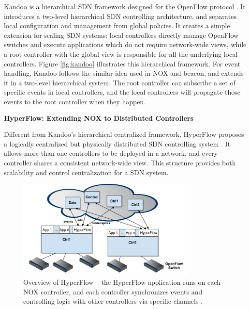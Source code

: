 \documentclass[english]{tktltiki}
\begin{document}
Kandoo is a hierarchical SDN framework designed for the OpenFlow protocol \cite{hyg12}. It introduces a two-level hierarchical SDN controlling architecture, and separates local configuration and management from global policies. It creates a simple extension for scaling SDN systems: local controllers directly manage OpenFlow switches and execute applications which do not require network-wide views, while a root controller with the global view is responsible for all the underlying local controllers. Figure \ref{fig:kandoo} illustrates this hierarchical framework. For event handling, Kandoo follows the similar idea used in NOX and beacon, and extends it in a two-level hierarchical system. The root controller can subscribe a set of specific events in local controllers, and the local controllers will propagate those events to the root controller when they happen.

\vspace{1mm}

\textbf{HyperFlow: Extending NOX to Distributed Controllers}

\vspace{1mm}

Different from Kandoo's hierarchical centralized framework, HyperFlow proposes a logically centralized but physically distributed SDN controlling system \cite{tg10}. It allows more than one controllers to be deployed in a network, and every controller shares a consistent network-wide view. This structure provides both scalability and control centralization for a SDN system.

\begin{figure}[htbp]
  \centering
  \includegraphics[width=0.8\textwidth]{images/hyperflow.png}
  \caption{Overview of HyperFlow -- the HyperFlow application runs on each NOX controller, and each controller synchronizes events and controlling logic with other controllers via specific channels \cite{tg10}.}
  \label{fig:hyperflow}
\end{figure}
\end{document}
